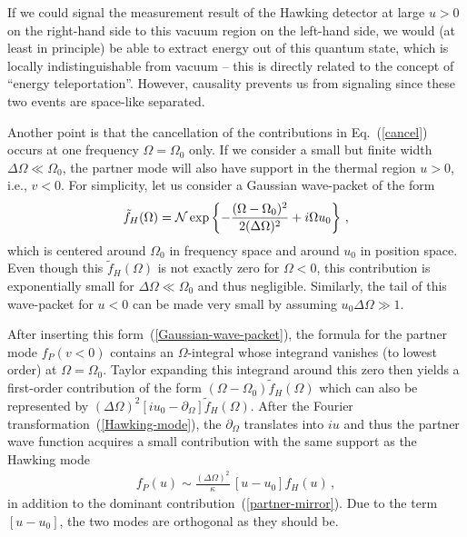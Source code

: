 \documentclass[aps,prd,showpacs,amssymb,nofootinbib,twocolumn]{revtex4}
\newcommand{\bea}{\begin{eqnarray}}
\newcommand{\ea}{\end{eqnarray}}
\begin{document}
If we could signal the measurement result of the Hawking detector at large 
$u>0$ on the right-hand side to this vacuum region on the left-hand side, 
we would (at least in principle) be able to extract energy out of this quantum 
state, which is locally indistinguishable from vacuum -- this is directly 
related to the concept of ``energy teleportation''. 
%
However, causality prevents us from signaling since these two events are 
space-like separated. 

Another point is that the cancellation of the contributions in 
Eq.~(\ref{cancel}) occurs at one frequency $\Omega=\Omega_0$ only.
%
If we consider a small but finite width $\Delta\Omega\ll\Omega_0$, 
the partner mode will also have support in the thermal region $u>0$, 
i.e., $v<0$. 
%
For simplicity, let us consider a Gaussian wave-packet of the form 
%
\bea
\label{Gaussian-wave-packet}
\tilde f_H(\Omega)={\cal N}\exp\left\{
-\frac{(\Omega-\Omega_0)^2}{2(\Delta\Omega)^2}+i\Omega u_0
\right\}
\,,
\ea
%
which is centered around $\Omega_0$ in frequency space and 
around $u_0$ in position space.
%
Even though this $\tilde f_H(\Omega)$ is not exactly zero for $\Omega<0$,
this contribution is exponentially small  for $\Delta\Omega\ll\Omega_0$
and thus negligible. 
%
Similarly, the tail of this wave-packet for $u<0$ can be made very small
by assuming $u_0\Delta\Omega\gg1$.

After inserting this form~(\ref{Gaussian-wave-packet}), 
the formula for the partner mode $f_P(v<0)$ contains an 
$\Omega$-integral whose integrand vanishes (to lowest order) 
at $\Omega=\Omega_0$.
%
Taylor expanding this integrand around this zero then yields 
a first-order contribution of the form $(\Omega-\Omega_0)\tilde f_H(\Omega)$
which can also be represented by 
$(\Delta\Omega)^2[iu_0-\partial_\Omega]\tilde f_H(\Omega)$.
%
After the Fourier transformation~(\ref{Hawking-mode}), the $\partial_\Omega$
translates into $iu$ and thus the partner wave function acquires a 
small contribution with the same support as the Hawking mode 
%
\bea
f_P(u)\sim\frac{(\Delta\Omega)^2}{\kappa}\,[u-u_0]f_H(u)
\,,
\ea
%
in addition to the dominant contribution~(\ref{partner-mirror}).
%
Due to the term $[u-u_0]$, the two modes are orthogonal as they should be. 

\end{document}
